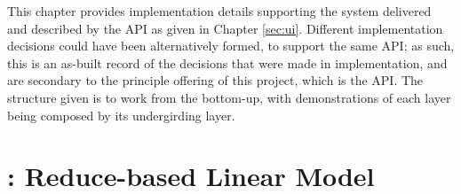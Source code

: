 This chapter provides implementation details supporting the system delivered and described by the API as given in Chapter \cref{sec:ui}.
Different implementation decisions could have been alternatively formed, to support the same API; as such, this is an as-built record of the decisions that were made in implementation, and are secondary to the principle offering of this project, which is the API.
The structure given is to work from the bottom-up, with demonstrations of each layer being composed by its undergirding layer.

\section{\orcv}

\section{\chunknet}

\section{\lso}

\section{\lsm: Reduce-based Linear Model}

